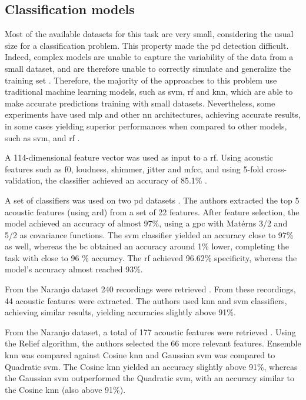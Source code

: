 \subsection{Classification models}

Most of the available datasets for this task are very small, considering the usual size for a classification problem. This property made the \gls{pd} detection difficult. Indeed, complex models are unable to capture the variability of the data from a small dataset, and are therefore unable to correctly simulate and generalize the training set \cite{underfitting_small_datasets}. Therefore, the majority of the approaches to this problem use traditional machine learning models, such as \gls{svm}, \gls{rf} and \gls{knn}, which are able to make accurate predictions training with small datasets. Nevertheless, some experiments have used \gls{mlp} and other \gls{nn} architectures, achieving accurate results, in some cases yielding superior performances when compared to other models, such as \gls{svm}, and \gls{rf} \cite{deep_mlp_parkinson}.

A 114-dimensional feature vector was used as input to a \gls{rf}. Using acoustic features such as \gls{f0}, loudness, shimmer, jitter and \gls{mfcc}, and using 5-fold cross-validation, the classifier achieved an accuracy of 85.1\% \cite{parkinson_acoustic_pompilli}. 

A set of classifiers was used on two \gls{pd} datasets \cite{parkinson_acoustic_despotovic}. The authors extracted the top 5 acoustic features (using \gls{ard}) from a set of 22 features. After feature selection, the model achieved an accuracy of almost 97\%, using a \gls{gpc} with Matérns 3/2 and 5/2 as covariance functions. The \gls{svm} classifier yielded an accuracy close to 97\% as well, whereas the \gls{bc} obtained an accuracy around 1\% lower, completing the task with close to 96 \% accuracy. The \gls{rf} achieved 96.62\% specificity, whereas the model's accuracy almost reached 93\%.

From the Naranjo dataset \cite{naranjo_dataset} 240 recordings were retrieved \cite{parkinson_acoustic_yaman}. From these recordings, 44 acoustic features were extracted. The authors used \gls{knn} and \gls{svm} classifiers, achieving similar results, yielding accuracies slightly above 91\%.

From the Naranjo dataset, a total of 177 acoustic features were retrieved \cite{parkinson_acoustic_yaman}. Using the Relief algorithm, the authors selected the 66 more relevant features. Ensemble \gls{knn} was compared against Cosine \gls{knn} and Gaussian \gls{svm} was compared to Quadratic \gls{svm}. The Cosine \gls{knn} yielded an accuracy slightly above 91\%, whereas the Gaussian \gls{svm} outperformed the Quadratic \gls{svm}, with an accuracy similar to the Cosine \gls{knn} (also above 91\%).

